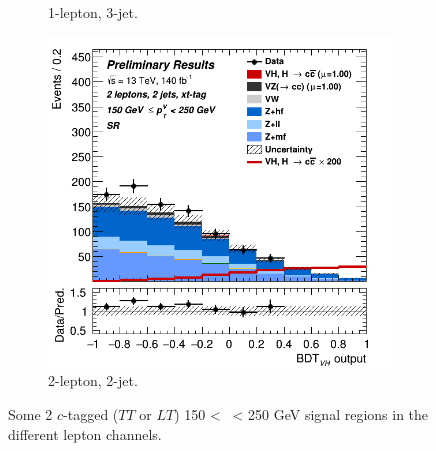 \begin{figure}[h!]
\begin{subfigure}[b]{0.32\textwidth}
      \caption{1-lepton, 3-jet.}
      \label{fig:plots_VHcc_ex_1L_SR_2C}
  \end{subfigure}
  \begin{subfigure}[b]{0.32\textwidth}
    \centering
    \includegraphics[width=\textwidth]{Images/VH/Own_fit/prefit_VHcc/Region_distmva_BMax250_BMin150_DSR_J2_TTypext_T2_L2_Y6051_Prefit.png}
    \caption{2-lepton, 2-jet.}
    \label{fig:plots_VHcc_ex_2L_SR_2C}
\end{subfigure}
  \caption{Some 2 $c$-tagged ($TT$ or $LT$) 150 < \ptv\ < 250 GeV signal regions in the different lepton channels.}
  \label{fig:plots_VHcc_ex_SR_2C}
\end{figure} 



